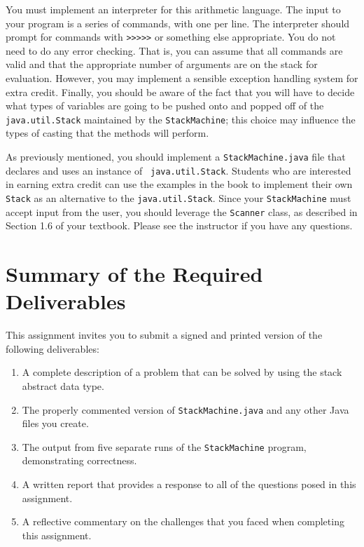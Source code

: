 You must implement an interpreter for this arithmetic language. The input to your program is a series of commands, with
one per line. The interpreter should prompt for commands with
\texttt{\textgreater{}\textgreater{}\textgreater{}\textgreater{}\textgreater{}} or something else appropriate. You do
not need to do any error checking.  That is, you can assume that all commands are valid and that the appropriate number
of arguments are on the stack for evaluation. However, you may implement a sensible exception handling system for
extra credit.  Finally, you should be aware of the fact that you will have to decide what types of variables are going
to be pushed onto and popped off of the {\tt java.util.Stack} maintained by the \texttt{StackMachine}; this choice may
influence the types of casting that the methods will perform.

As previously mentioned, you should implement a {\tt StackMachine.java} file that declares and uses an instance of {\tt
java.util.Stack}. Students who are interested in earning extra credit can use the examples in the book to implement
their own {\tt Stack} as an alternative to the {\tt java.util.Stack}.  Since your {\tt StackMachine} must accept input
from the user, you should leverage the {\tt Scanner} class, as described in Section 1.6 of your textbook. Please see the
instructor if you have any questions.

\section*{Summary of the Required Deliverables}

This assignment invites you to submit a signed and printed version of the following deliverables:

\begin{enumerate}
  \itemsep0pt

  \item A complete description of a problem that can be solved by using the stack abstract data type.

  \item The properly commented version of {\tt StackMachine.java} and any other Java files you create.

  \item The output from five separate runs of the {\tt StackMachine} program, demonstrating correctness.

  \item A written report that provides a response to all of the questions posed in this assignment.

  \item A reflective commentary on the challenges that you faced when completing this assignment.

\end{enumerate}

